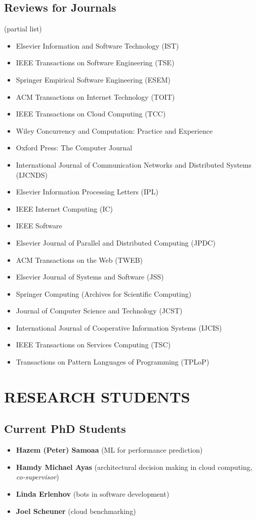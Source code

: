 \documentclass[paper=letter,fontsize=11pt]{scrartcl} %
\newcommand{\NewPart}[2]{\section*{\uppercase{#1} #2}}
\begin{document}
\subsection*{Reviews for Journals}

(partial list)

\begin{itemize}
\item Elsevier Information and Software Technology (IST)
\item IEEE Transactions on Software Engineering (TSE)
\item Springer Empirical Software Engineering (ESEM)
\item ACM Transactions on Internet Technology (TOIT)
\item IEEE Transactions on Cloud Computing (TCC)
\item Wiley Concurrency and Computation: Practice and Experience
\item Oxford Press: The Computer Journal
\item International Journal of Communication Networks and Distributed Systems (IJCNDS)
\item Elsevier Information Processing Letters (IPL)
\item IEEE Internet Computing (IC)
\item IEEE Software
\item Elsevier Journal of Parallel and Distributed Computing (JPDC)
\item ACM Transactions on the Web (TWEB)
\item Elsevier Journal of Systems and Software (JSS)
\item Springer Computing (Archives for Scientific Computing)
\item Journal of Computer Science and Technology (JCST)
\item International Journal of Cooperative Information Systems (IJCIS)
\item IEEE Transactions on Services Computing (TSC)
\item Transactions on Pattern Languages of Programming (TPLoP)
\end{itemize}

\NewPart{Research Students}{}

\subsection*{Current PhD Students}

\begin{itemize}
\item \textbf{Hazem (Peter) Samoaa}  (ML for performance prediction)
\item \textbf{Hamdy Michael Ayas}  (architectural decision making in cloud computing, \emph{co-supervisor})
\item \textbf{Linda Erlenhov}  (bots in software development)
\item \textbf{Joel Scheuner}  (cloud benchmarking)
\end{itemize}
\end{document}
